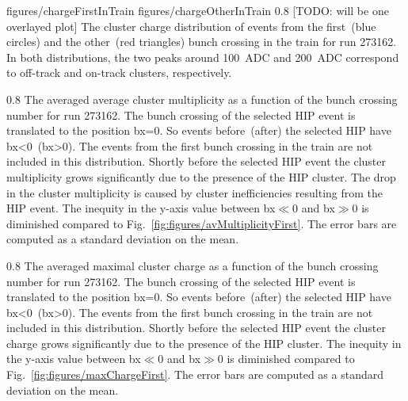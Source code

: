                  {figures/chargeFirstInTrain} %
                 {figures/chargeOtherInTrain} %
                 {0.8}       %
                 {[TODO: will be one overlayed plot] The cluster charge distribution of events from the first~(blue circles) and the other~(red triangles) bunch crossing in the train for run 273162. In both distributions, the two peaks around 100~ADC and 200~ADC correspond to off-track and on-track clusters, respectively. } %


                 {0.8}       %
                 {The averaged average cluster multiplicity as a function of the bunch crossing number for run 273162. The bunch crossing of the selected HIP event is translated to the position bx=0. So events before~(after) the selected HIP have bx<0~(bx>0). The events from the first bunch crossing in the train are not included in this distribution. Shortly before the selected HIP event the cluster multiplicity grows significantly due to the presence of the HIP cluster.  The drop in the cluster multiplicity is caused by cluster inefficiencies resulting from the HIP event. The inequity in the y-axis value between bx$\ll$0 and bx$\gg$0 is diminished compared to Fig.~\ref{fig:figures/avMultiplicityFirst}. The error bars are computed as a standard deviation on the mean. } %

                 {0.8}       %
                 {The averaged maximal cluster charge as a function of the bunch crossing number for run 273162. The bunch crossing of the selected HIP event is translated to the position bx=0. So events before~(after) the selected HIP have bx<0~(bx>0). The events from the first bunch crossing in the train are not included in this distribution. Shortly before the selected HIP event the cluster charge grows significantly due to the presence of the HIP cluster. The inequity in the y-axis value between bx$\ll$0 and bx$\gg$0 is diminished compared to Fig.~\ref{fig:figures/maxChargeFirst}. The error bars are computed as a standard deviation on the mean. } %

